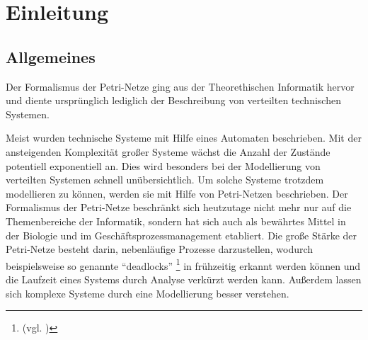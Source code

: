 
\chapter{Einleitung}
\section{Allgemeines}
Der Formalismus der Petri-Netze ging aus der Theorethischen Informatik hervor
und diente ursprünglich lediglich der Beschreibung von verteilten technischen Systemen.

Meist wurden technische Systeme mit Hilfe eines Automaten beschrieben.
Mit der ansteigenden Komplexität großer Systeme wächst die Anzahl der Zustände potentiell exponentiell an.
Dies wird besonders bei der Modellierung von verteilten Systemen schnell unübersichtlich.
Um solche Systeme trotzdem modellieren zu können, werden sie mit Hilfe von Petri-Netzen beschrieben.
Der Formalismus der Petri-Netze beschränkt sich heutzutage nicht mehr nur auf die Themenbereiche der Informatik,
sondern hat sich auch als bewährtes Mittel in der Biologie und im Geschäftsprozessmanagement etabliert.
Die große Stärke der Petri-Netze besteht darin, nebenläufige Prozesse darzustellen,
wodurch beispielsweise so genannte \enquote{deadlocks} \footnote{(vgl. \cite{microsoft:deadlocks})}
in frühzeitig erkannt werden können und
die Laufzeit eines Systems durch Analyse verkürzt werden kann.
Außerdem lassen sich komplexe Systeme durch eine Modellierung besser verstehen.
\newpage

